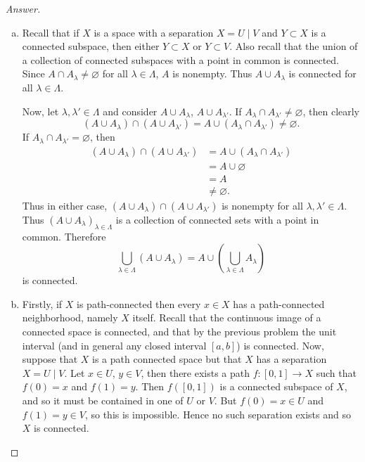 \documentclass[12pt]{article}
\newcommand\paren[1]{\left( #1 \right)}
\theoremstyle{definition}
\begin{document}
\begin{proof}[Answer]
    \noindent
    \begin{enumerate}[(a)]
        \item Recall that if $X$ is a space with a separation $X = U \mid V$ and $Y \subset X$ is a connected subspace, then either $Y \subset X$ or $Y \subset V$. Also recall that the union of a collection of connected subspaces with a point in common is connected. Since $A \cap A_{\lambda} \neq \varnothing$ for all $\lambda \in \Lambda$, $A$ is nonempty. Thus $A \cup A_{\lambda}$ is connected for all $\lambda \in \Lambda$. 
        
        Now, let $\lambda , \lambda' \in \Lambda$ and consider $A \cup A_{\lambda}$, $A \cup A_{\lambda'}$. If $A_{\lambda} \cap A_{\lambda'} \neq \varnothing$, then clearly 
        \[
            \paren{ A \cup A_{\lambda} } \cap \paren{ A \cup A_{\lambda'} } = A \cup \paren{ A_{\lambda} \cap A_{\lambda'} } \neq \varnothing.
        \]
        If $A_{\lambda} \cap A_{\lambda'} = \varnothing$, then 
        \begin{align*}
            \paren{ A \cup A_{\lambda} } \cap \paren{ A \cup A_{\lambda'} } & = A \cup \paren{ A_{\lambda} \cap A_{\lambda'} } \\
            & = A \cup \varnothing \\
            & = A \\
            & \neq \varnothing.
        \end{align*}
        Thus in either case, $\paren{ A \cup A_{\lambda} } \cap \paren{ A \cup A_{\lambda'} }$ is nonempty for all $\lambda , \lambda' \in \Lambda$. Thus $\paren{ A \cup A_{\lambda} }_{\lambda \in \Lambda}$ is a collection of connected sets with a point in common. Therefore 
        \[
            \bigcup\limits_{\lambda \in \Lambda} \paren{ A \cup A_{\lambda} } = A \cup \paren{ \bigcup\limits_{\lambda \in \Lambda} A_{\lambda} }
        \]
        is connected.
        \item Firstly, if $X$ is path-connected then every $x \in X$ has a path-connected neighborhood, namely $X$ itself. Recall that the continuous image of a connected space is connected, and that by the previous problem the unit interval (and in general any closed interval $[a,b]$) is connected. Now, suppose that $X$ is a path connected space but that $X$ has a separation $X = U \mid V$. Let $x \in U$, $y \in V$, then there exists a path $f : [0,1] \to X$ such that $f(0) = x$ and $f(1) = y$. Then $f \paren{ [0,1] }$ is a connected subspace of $X$, and so it must be contained in one of $U$ or $V$. But $f(0) = x \in U$ and $f(1) = y \in V$, so this is impossible. Hence no such separation exists and so $X$ is connected.
        

\end{enumerate}
\end{proof}
\end{document}
